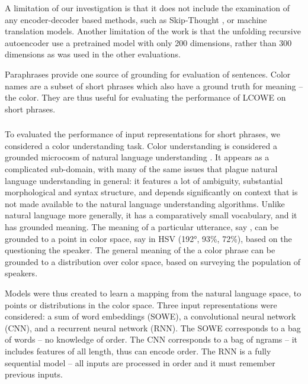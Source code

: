 \documentclass{book}
\begin{document}
A limitation of our investigation is that it does not include the examination of any encoder-decoder based methods, such as Skip-Thought \citep{DBLP:journals/corr/KirosZSZTUF15}, or machine translation models.
Another limitation of the work is that the unfolding recursive autoencoder \citep{SocherEtAl2011:PoolRAE}  use a pretrained model with only 200 dimensions, rather than 300 dimensions as was used in the other evaluations.



Paraphrases provide one source of grounding for evaluation of sentences.
Color names are a subset of short phrases which also have a ground truth for meaning -- the color.
They are thus useful for evaluating the performance of LCOWE on short phrases.

\subsubsection{ }
To evaluated the performance of input representations for short phrases, we considered a color understanding task.
Color understanding is considered a grounded microcosm of natural language understanding \citep{2016arXiv160603821M}.
It appears as a complicated sub-domain, with many of the same issues that plague natural language understanding in general:
it features a lot of ambiguity, substantial morphological and syntax structure, and depends significantly on context that is not made available to the natural language understanding algorithms.
Unlike natural language more generally, it has a comparatively small vocabulary, and it has grounded meaning.
The meaning of a particular utterance, say , can be grounded to a point in color space, say in HSV (192°, 93\%, 72\%), based on the questioning the speaker.
The general meaning of the a color phrase can be grounded to a distribution over color space, based on surveying the population of speakers.

Models were thus created to learn a mapping from the natural language space, to points or distributions in the color space.
Three input representations were considered: a sum of word embeddings (SOWE), a convolutional neural network (CNN), and a recurrent neural network (RNN).
The SOWE corresponds to a bag of words -- no knowledge of order.
The CNN corresponds to a bag of ngrams -- it includes features of all length, thus can encode order.
The RNN is a fully sequential model -- all inputs are processed in order and it must remember previous inputs.
\end{document}
